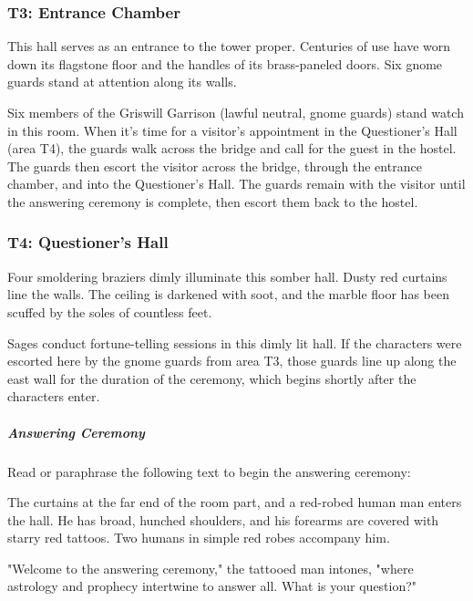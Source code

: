 \documentclass[10pt,a4paper,twoside,bg=print,twocolumn,openany,nodeprecatedcode]{dndbook}
\begin{document}
\subsubsection{T3: Entrance Chamber}
\begin{DndReadAloud}{}
This hall serves as an entrance to the tower proper. Centuries of use have worn down its flagstone floor and the handles of its brass-paneled doors. Six gnome guards stand at attention along its walls.

\end{DndReadAloud}

Six members of the Griswill Garrison (lawful neutral, gnome guards) stand watch in this room. When it's time for a visitor's appointment in the Questioner's Hall (area T4), the guards walk across the bridge and call for the guest in the hostel. The guards then escort the visitor across the bridge, through the entrance chamber, and into the Questioner's Hall. The guards remain with the visitor until the answering ceremony is complete, then escort them back to the hostel.

\subsubsection{T4: Questioner's Hall}
\begin{DndReadAloud}{}
Four smoldering braziers dimly illuminate this somber hall. Dusty red curtains line the walls. The ceiling is darkened with soot, and the marble floor has been scuffed by the soles of countless feet.

\end{DndReadAloud}

Sages conduct fortune-telling sessions in this dimly lit hall. If the characters were escorted here by the gnome guards from area T3, those guards line up along the east wall for the duration of the ceremony, which begins shortly after the characters enter.

\subparagraph{Answering Ceremony}
Read or paraphrase the following text to begin the answering ceremony:

\begin{DndReadAloud}{}
The curtains at the far end of the room part, and a red-robed human man enters the hall. He has broad, hunched shoulders, and his forearms are covered with starry red tattoos. Two humans in simple red robes accompany him.

"Welcome to the answering ceremony," the tattooed man intones, "where astrology and prophecy intertwine to answer all. What is your question?"

\end{DndReadAloud}
\end{document}
